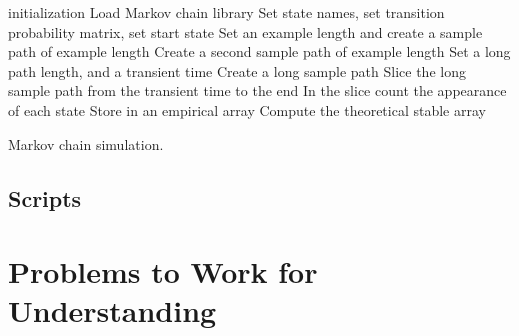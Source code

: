 \documentclass[12pt]{article}
\begin{document}
\begin{algorithm}[H]
    \SetAlgoLined {}

    initialization\; Load Markov chain library\; Set state names, set
    transition probability matrix, set start state\; Set an example
    length and create a sample path of example length\; Create a second
    sample path of example length\; Set a long path length, and a
    transient time\; Create a long sample path\; Slice the long sample
    path from the transient time to the end\; In the slice count the
    appearance of each state\; Store in an empirical array\; Compute the
    theoretical stable array\;

    \caption{Markov chain simulation.}
\end{algorithm}

\subsection*{Scripts}



\hr

\section*{Problems to Work for Understanding}
\renewcommand{\theexerciseseries}{}
\renewcommand{\theexercise}{\arabic{exercise}}
\end{document}
